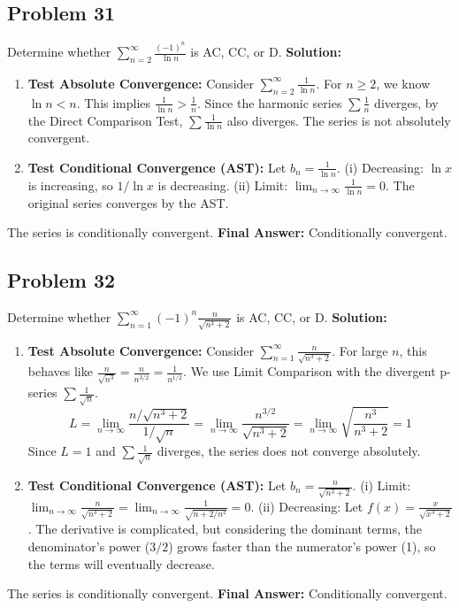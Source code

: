 \documentclass{article}
\begin{document}
\subsection*{Problem 31}
Determine whether $\sum_{n=2}^{\infty} \frac{(-1)^n}{\ln n}$ is AC, CC, or D.
\textbf{Solution:}
\begin{enumerate}
    \item \textbf{Test Absolute Convergence:} Consider $\sum_{n=2}^{\infty} \frac{1}{\ln n}$. For $n \ge 2$, we know $\ln n < n$. This implies $\frac{1}{\ln n} > \frac{1}{n}$. Since the harmonic series $\sum \frac{1}{n}$ diverges, by the Direct Comparison Test, $\sum \frac{1}{\ln n}$ also diverges. The series is not absolutely convergent.
    \item \textbf{Test Conditional Convergence (AST):} Let $b_n = \frac{1}{\ln n}$.
    (i) Decreasing: $\ln x$ is increasing, so $1/\ln x$ is decreasing.
    (ii) Limit: $\lim_{n \to \infty} \frac{1}{\ln n} = 0$.
    The original series converges by the AST.
\end{enumerate}
The series is conditionally convergent.
\textbf{Final Answer:} Conditionally convergent.

\subsection*{Problem 32}
Determine whether $\sum_{n=1}^{\infty} (-1)^n \frac{n}{\sqrt{n^3+2}}$ is AC, CC, or D.
\textbf{Solution:}
\begin{enumerate}
    \item \textbf{Test Absolute Convergence:} Consider $\sum_{n=1}^{\infty} \frac{n}{\sqrt{n^3+2}}$. For large $n$, this behaves like $\frac{n}{\sqrt{n^3}} = \frac{n}{n^{3/2}} = \frac{1}{n^{1/2}}$. We use Limit Comparison with the divergent p-series $\sum \frac{1}{\sqrt{n}}$.
    \[ L = \lim_{n \to \infty} \frac{n/\sqrt{n^3+2}}{1/\sqrt{n}} = \lim_{n \to \infty} \frac{n^{3/2}}{\sqrt{n^3+2}} = \lim_{n \to \infty} \sqrt{\frac{n^3}{n^3+2}} = 1 \]
    Since $L=1$ and $\sum \frac{1}{\sqrt{n}}$ diverges, the series does not converge absolutely.
    \item \textbf{Test Conditional Convergence (AST):} Let $b_n = \frac{n}{\sqrt{n^3+2}}$.
    (i) Limit: $\lim_{n \to \infty} \frac{n}{\sqrt{n^3+2}} = \lim_{n \to \infty} \frac{1}{\sqrt{n+2/n^2}} = 0$.
    (ii) Decreasing: Let $f(x) = \frac{x}{\sqrt{x^3+2}}$. The derivative is complicated, but considering the dominant terms, the denominator's power ($3/2$) grows faster than the numerator's power (1), so the terms will eventually decrease.
\end{enumerate}
The series is conditionally convergent.
\textbf{Final Answer:} Conditionally convergent.
\end{document}
